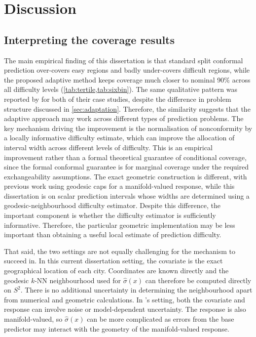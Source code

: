 \chapter{Discussion}
\label{ch:discussion}

\section{Interpreting the coverage results}

The main empirical finding of this dissertation is that standard split conformal prediction over-covers easy regions and badly under-covers difficult regions, while the proposed adaptive method keeps coverage much closer to nominal 90\% across all difficulty levels (\cref{tab:tertile,tab:sixbin}). The same qualitative pattern was reported by \citet{amirishahbazi2026} for both of their case studies, despite the difference in problem structure discussed in \cref{sec:adaptation}. Therefore, the similarity suggests that the adaptive approach may work across different types of prediction problems. The key mechanism driving the improvement is the normalisation of nonconformity by a locally informative difficulty estimate, which can improve the allocation of interval width across different levels of difficulty. This is an empirical improvement rather than a formal theoretical guarantee of conditional coverage, since the formal conformal guarantee is for marginal coverage under the required exchangeability assumptions. The exact geometric construction is different, with previous work using geodesic caps for a manifold-valued response, while this dissertation is on scalar prediction intervals whose widths are determined using a geodesic-neighbourhood difficulty estimator. Despite this difference, the important component is whether the difficulty estimator is sufficiently informative. Therefore, the particular geometric implementation may be less important than obtaining a useful local estimate of prediction difficulty.
 
That said, the two settings are not equally challenging for the mechanism to succeed in. In this current dissertation setting, the covariate is the exact geographical location of each city. Coordinates are known directly and the geodesic $k$-NN neighbourhood used for $\hat\sigma(x)$ can therefore be computed directly on $S^2$. There is no additional uncertainty in determining the neighbourhood apart from numerical and geometric calculations. In \citeauthor{amirishahbazi2026}'s setting, both the covariate and response can involve noise or model-dependent uncertainty. The response is also manifold-valued, so $\hat\sigma(x)$ can be more complicated as errors from the base predictor may interact with the geometry of the manifold-valued response. 


